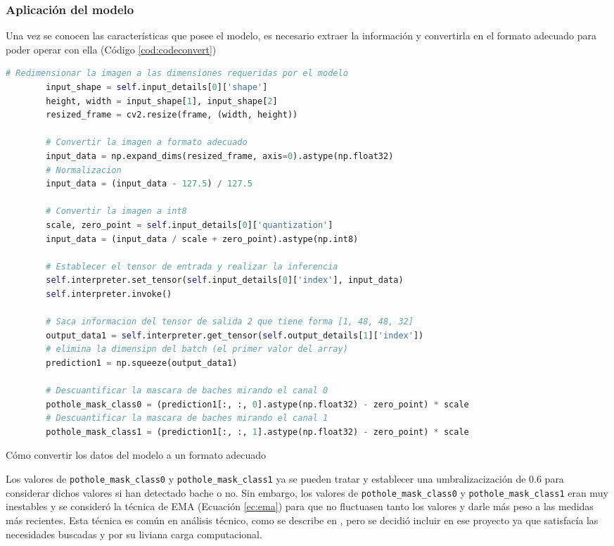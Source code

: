 \subsubsection{Aplicación del modelo}
\label{subsec:aplicacionmodelo}

Una vez se conocen las características que posee el modelo, es necesario extraer la información y convertirla en el formato adecuado para poder operar con ella (Código \ref{cod:codeconvert})

\begin{code}[h]
	\begin{lstlisting}[language=Python]
		# Redimensionar la imagen a las dimensiones requeridas por el modelo
		input_shape = self.input_details[0]['shape']
		height, width = input_shape[1], input_shape[2]
		resized_frame = cv2.resize(frame, (width, height))
		
		# Convertir la imagen a formato adecuado
		input_data = np.expand_dims(resized_frame, axis=0).astype(np.float32)
		# Normalizacion 
		input_data = (input_data - 127.5) / 127.5 
		
		# Convertir la imagen a int8
		scale, zero_point = self.input_details[0]['quantization']
		input_data = (input_data / scale + zero_point).astype(np.int8)
		
		# Establecer el tensor de entrada y realizar la inferencia
		self.interpreter.set_tensor(self.input_details[0]['index'], input_data)
		self.interpreter.invoke()
		
		# Saca informacion del tensor de salida 2 que tiene forma [1, 48, 48, 32] 
		output_data1 = self.interpreter.get_tensor(self.output_details[1]['index'])
		# elimina la dimensipn del batch (el primer valor del array)
		prediction1 = np.squeeze(output_data1)
		
		# Descuantificar la mascara de baches mirando el canal 0
		pothole_mask_class0 = (prediction1[:, :, 0].astype(np.float32) - zero_point) * scale
		# Descuantificar la mascara de baches mirando el canal 1
		pothole_mask_class1 = (prediction1[:, :, 1].astype(np.float32) - zero_point) * scale
	\end{lstlisting}
	\caption[Cómo convertir los datos del modelo a un formato adecuado]{Cómo convertir los datos del modelo a un formato adecuado}
	\label{cod:codeconvert}
\end{code}

Los valores de \verb|pothole_mask_class0| y \verb|pothole_mask_class1| ya se pueden tratar y establecer una umbralizacización de 0.6 para considerar dichos valores si han detectado bache o no. Sin embargo, los valores de \verb|pothole_mask_class0| y \verb|pothole_mask_class1| eran muy inestables y se consideró la técnica de \ac{EMA} (Ecuación \ref{ec:ema}) para que no fluctuasen tanto los valores y darle más peso a las medidas más recientes. Esta técnica es común en análisis técnico, como se describe en \cite{6708545}, pero se decidió incluir en ese proyecto ya que satisfacía las necesidades buscadas y por su liviana carga computacional.

